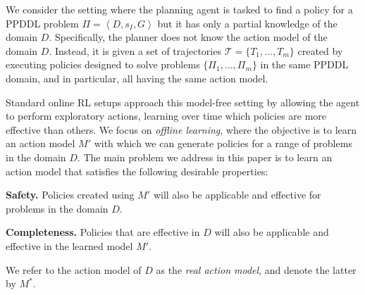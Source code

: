 \documentclass[letterpaper]{article} %
\newcommand{\tuple}[1]{\ensuremath{\left \langle #1 \right \rangle }}
\begin{document}


We consider the setting where the planning agent is tasked to find a policy for a PPDDL problem
$\Pi=\tuple{D, s_I, G}$ but it has only a partial knowledge of the domain $D$.  %
Specifically, the planner does not know the action model of the domain $D$. 
Instead, it is given a set of trajectories $\mathcal{T}=\{T_1,\ldots, T_m\}$ created by executing policies designed to solve problems 
$\{ \Pi_1,\ldots,\Pi_m \}$ in the same PPDDL domain, and in particular, all having the same action model. 


Standard online RL setups approach this model-free setting by allowing the agent to perform exploratory actions, learning over time which policies are more effective than others. 
We focus on \emph{offline learning},  where the 
objective is to learn an action model $M'$ with which we can generate policies for a range of problems in the domain $D$. 
The main problem we address in this paper is to learn an action model that satisfies the following desirable properties:
\begin{compactenum}
    \item \textbf{Safety.} Policies created using $M'$ will also be applicable and effective for problems in the domain $D$.
    \item \textbf{Completeness.} Policies that are effective in $D$ will also be applicable and effective in the learned model $M'$.
\end{compactenum}
We refer to the action model of $D$ as the \emph{real action model}, and denote the latter by $M^*$. 
\end{document}
